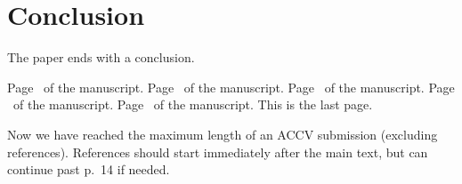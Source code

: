 \documentclass[runningheads]{llncs}
\begin{document}
\section{Conclusion}
The paper ends with a conclusion. 

\clearpage\mbox{}Page \thepage\ of the manuscript.
\clearpage\mbox{}Page \thepage\ of the manuscript.
\clearpage\mbox{}Page \thepage\ of the manuscript.
\clearpage\mbox{}Page \thepage\ of the manuscript.
\clearpage\mbox{}Page \thepage\ of the manuscript. This is the last page.
\par\vfill\par
Now we have reached the maximum length of an ACCV \ACCVyear{} submission (excluding references).
References should start immediately after the main text, but can continue past p.\ 14 if needed.
\clearpage  %


%
%


\end{document}
